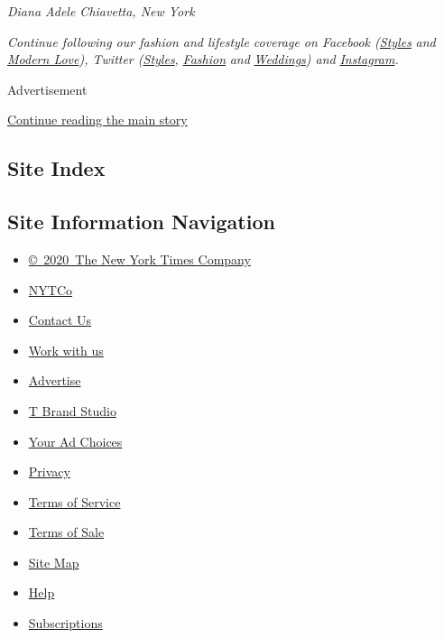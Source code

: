 \emph{Diana Adele Chiavetta, New York}

\emph{Continue following our fashion and lifestyle coverage on Facebook
(}\href{https://www.facebookcorewwwi.onion/nytimesstyles}{\emph{Styles}}
\emph{and}
\href{https://www.facebookcorewwwi.onion/modernlove}{\emph{Modern
Love}}\emph{), Twitter
(}\href{https://twitter.com/nytstyles}{\emph{Styles}}\emph{,}
\href{https://twitter.com/nytfashion}{\emph{Fashion}} \emph{and}
\href{https://twitter.com/nytimesvows}{\emph{Weddings}}\emph{) and}
\href{https://instagram.com/nytimesfashion}{\emph{Instagram}}\emph{.}

Advertisement

\protect\hyperlink{after-bottom}{Continue reading the main story}

\hypertarget{site-index}{%
\subsection{Site Index}\label{site-index}}

\hypertarget{site-information-navigation}{%
\subsection{Site Information
Navigation}\label{site-information-navigation}}

\begin{itemize}
\tightlist
\item
  \href{https://help.nytimes3xbfgragh.onion/hc/en-us/articles/115014792127-Copyright-notice}{©~2020~The
  New York Times Company}
\end{itemize}

\begin{itemize}
\tightlist
\item
  \href{https://www.nytco.com/}{NYTCo}
\item
  \href{https://help.nytimes3xbfgragh.onion/hc/en-us/articles/115015385887-Contact-Us}{Contact
  Us}
\item
  \href{https://www.nytco.com/careers/}{Work with us}
\item
  \href{https://nytmediakit.com/}{Advertise}
\item
  \href{http://www.tbrandstudio.com/}{T Brand Studio}
\item
  \href{https://www.nytimes3xbfgragh.onion/privacy/cookie-policy\#how-do-i-manage-trackers}{Your
  Ad Choices}
\item
  \href{https://www.nytimes3xbfgragh.onion/privacy}{Privacy}
\item
  \href{https://help.nytimes3xbfgragh.onion/hc/en-us/articles/115014893428-Terms-of-service}{Terms
  of Service}
\item
  \href{https://help.nytimes3xbfgragh.onion/hc/en-us/articles/115014893968-Terms-of-sale}{Terms
  of Sale}
\item
  \href{https://spiderbites.nytimes3xbfgragh.onion}{Site Map}
\item
  \href{https://help.nytimes3xbfgragh.onion/hc/en-us}{Help}
\item
  \href{https://www.nytimes3xbfgragh.onion/subscription?campaignId=37WXW}{Subscriptions}
\end{itemize}

